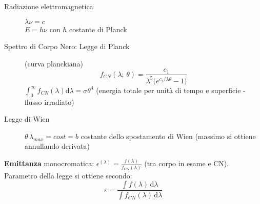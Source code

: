 \documentclass[10pt, oneside]{article}
\begin{document}
\begin{minipage}{0.4\textwidth}
\centering
\vspace{-1cm}
\end{minipage}
\begin{minipage}{0.6\textwidth}
\begin{description}
\item[Radiazione elettromagnetica] $\displaystyle \lambda \nu = c$ 
\\$\displaystyle E = h \nu$ con $h$ costante di Planck
\item[Spettro di Corpo Nero: Legge di Planck] (curva planckiana)
\[\boxed{f_{CN}(\lambda; \, \theta) = \frac{c_1}{\lambda^5 \big(\displaystyle e^{c_2 / \lambda \theta} - 1 \big)}}\]
$\displaystyle \int_{0}^{\infty}f_{CN}(\lambda) \mathrm{d}\lambda = \sigma \theta^4$ (energia totale per unità di tempo e superficie - flusso irradiato)
\end{description}
\end{minipage}
\begin{description}
\item[Legge di Wien] $\displaystyle \theta \, \lambda_{max} = cost = b$ costante dello spostamento di Wien (massimo si ottiene annullando derivata)
\end{description}
\textbf{Emittanza} monocromatica: $\displaystyle \epsilon^{(\lambda)} = \frac{f(\lambda)}{f_{CN}(\lambda)}$ (tra corpo in esame e CN). Parametro della legge si ottiene secondo:
\[\varepsilon = \frac{\int f(\lambda)\, \mathrm{d}\lambda}{\int f_{CN}(\lambda)\, \mathrm{d}\lambda}\]
\end{document}
